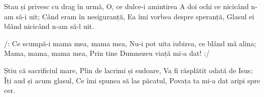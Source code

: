 \beginverse
Stau și privesc cu drag în urmă,
O, ce dulce-i amintirea
A doi ochi ce nicicând n-am să-i uit;
Când eram în nesiguranță,
Ea îmi vorbea despre speranță,
Glasul ei blând nicicând n-am să-l uit.
\endverse

\beginchorus
/: Ce scumpă-i mama mea, mama mea,
Nu-i pot uita iubirea, ce blând mă alina;
Mama, mama, mama mea,
Prin tine Dumnezeu viață mi-a dat! :/
\endchorus

\beginverse
Știu că sacrificiul mare,
Plin de lacrimi și sudoare,
Va fi răsplătit odată de Isus;
Îți aud și acum glasul,
Ce îmi spunea să las păcatul,
Povața ta mi-a dat aripi spre cer.
\endverse
\endsong
